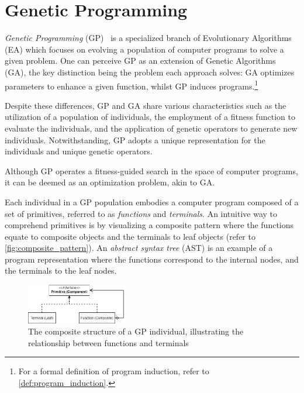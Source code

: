\section{Genetic Programming}
\label{sec:genetic_programming}
  \emph{Genetic Programming} (GP)~\autocite{kozaGeneticProgrammingProgramming1992a,kozaGeneticProgrammingII1994,poliFieldGuideGenetic2008a,yuIntroductionEvolutionaryAlgorithms2010}
  is a specialized branch of Evolutionary Algorithms (EA) which focuses on 
  evolving a population of computer programs to solve a given problem.
  One can perceive GP as an extension of Genetic Algorithms (GA), the key
  distinction being the problem each approach solves: GA optimizes parameters to 
  enhance a given function, whilst GP induces programs.\footnote{%
      For a formal definition of program induction, refer to 
      \vref{def:program_induction}.
  }

  Despite these differences, GP and GA share various characteristics such as the 
  utilization of a population of individuals, the employment of a fitness function
  to evaluate the individuals, and the application of genetic operators to 
  generate new individuals.
  Notwithstanding, GP adopts a unique representation for the individuals and 
  unique genetic operators.

  \begin{remark}
    Although GP operates a fitness-guided search in the space of computer 
    programs, it can be deemed as an optimization problem, akin to GA.
  \end{remark}

  Each individual in a GP population embodies a computer program composed of a set
  of primitives, referred to as \emph{functions} and \emph{terminals}.
  An intuitive way to comprehend primitives is by visualizing a composite pattern
  where the functions equate to composite objects and the terminals to leaf
  objects (refer to \vref{fig:composite_pattern}).
  An \emph{abstract syntax tree} (AST) is an example of a program representation
  where the functions correspond to the internal nodes, and the terminals to the
  leaf nodes.

  \begin{figure}[ht!]
    \centering
    \includegraphics[width=0.4\textwidth]{img/theoretical_framework/GP Composite.png}
    \caption{
      The composite structure of a GP individual, illustrating the relationship
      between functions and terminals
    }
    \label{fig:composite_pattern}
  \end{figure}

